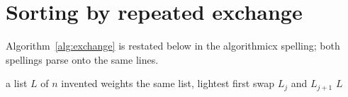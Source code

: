\documentclass{article}
\begin{document}
\section{Sorting by repeated exchange}

\begin{algorithm}
\caption{Exchange sort of an invented list.}
\label{alg:exchange}
\LinesNumbered
{}
\;
\end{algorithm}

Algorithm~\ref{alg:exchange} is restated below in the algorithmicx
spelling; both spellings parse onto the same lines.

\begin{algorithm}
\caption{The same exchange sort, algorithmicx spelling.}
\begin{algorithmic}[1]
\Require a list $L$ of $n$ invented weights
\Ensure the same list, lightest first
      \State swap $L_j$ and $L_{j+1}$ 
    \EndIf
  \EndFor
\EndFor
\State \Return $L$
\end{algorithmic}
\end{algorithm}
\end{document}
